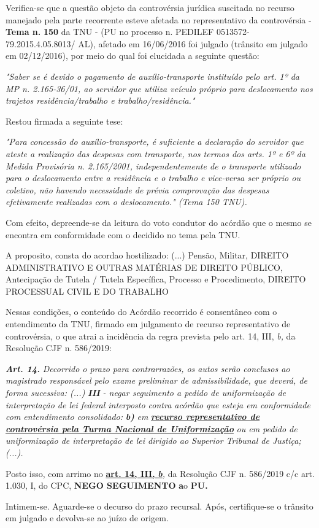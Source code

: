 \documentclass[12pt]{article}
\begin{document}
\justifying
\noindent Verifica-se que a questão objeto da controvérsia jurídica suscitada no recurso manejado pela parte recorrente esteve afetada no representativo da controvérsia - \textbf{Tema n. }\textbf{150} da TNU - (PU no processo n. PEDILEF 0513572-79.2015.4.05.8013/ AL),  afetado em 16/06/2016 foi julgado (trânsito em julgado em 02/12/2016), por meio do qual foi elucidada a seguinte questão:

\noindent \textit{"Saber se é devido o pagamento de auxílio-transporte instituído pelo art. 1º da MP n. 2.165-36/01, ao servidor que utiliza veículo próprio para deslocamento nos trajetos residência/trabalho e trabalho/residência."}

\noindent Restou firmada a seguinte tese:

\noindent \textit{"Para concessão do auxílio-transporte, é suficiente a declaração do servidor que ateste a realização das despesas com transporte, nos termos dos arts. 1º e 6º da Medida Provisória n. 2.165/2001, independentemente de o transporte utilizado para o deslocamento entre a residência e o trabalho e vice-versa ser próprio ou coletivo, não havendo necessidade de prévia comprovação das despesas efetivamente realizadas com o deslocamento." (Tema 150 TNU).}

\noindent Com efeito, depreende-se da leitura do voto condutor do acórdão que o mesmo se encontra em conformidade com o decidido no  tema pela TNU.

\noindent A proposito, consta do acordao hostilizado: (...) Pensão, Militar, DIREITO ADMINISTRATIVO E OUTRAS MATÉRIAS DE DIREITO PÚBLICO, Antecipação de Tutela / Tutela Específica, Processo e Procedimento, DIREITO PROCESSUAL CIVIL E DO TRABALHO

\noindent Nessas condições, o conteúdo do Acórdão recorrido é consentâneo com o entendimento da TNU, firmado em julgamento de recurso representativo de controvérsia, o que atrai a incidência da regra prevista pelo art. 14, III, \textit{b,} da Resolução CJF n. 586/2019:

\noindent \textit{\textbf{Art. 14.}}\textit{ Decorrido o prazo para contrarrazões, os autos serão conclusos ao magistrado responsável pelo exame preliminar de admissibilidade, que deverá, de forma sucessiva: (...) }\textit{\textbf{III }}\textit{- negar seguimento a pedido de uniformização de interpretação de lei federal interposto contra acórdão que esteja em conformidade com entendimento consolidado: }\textit{\textbf{b)}}\textit{ em }\uline{\textit{\textbf{recurso representativo de controvérsia pela Turma Nacional de Uniformização}}}\textit{ ou em pedido de uniformização de interpretação de lei dirigido ao Superior Tribunal de Justiça;(...).}

\noindent Posto isso, com arrimo no \uline{\textbf{art. 14, III, }}\uline{\textit{\textbf{b}}}\textit{,} da Resolução CJF n. 586/2019 c/c art. 1.030, I, do CPC, \textbf{NEGO SEGUIMENTO }\textbf{a}o\textbf{ PU}\textbf{.}

\noindent Intimem-se. Aguarde-se o decurso do prazo recursal. Após, certifique-se o trânsito em julgado e devolva-se ao juízo de origem.
\end{document}
